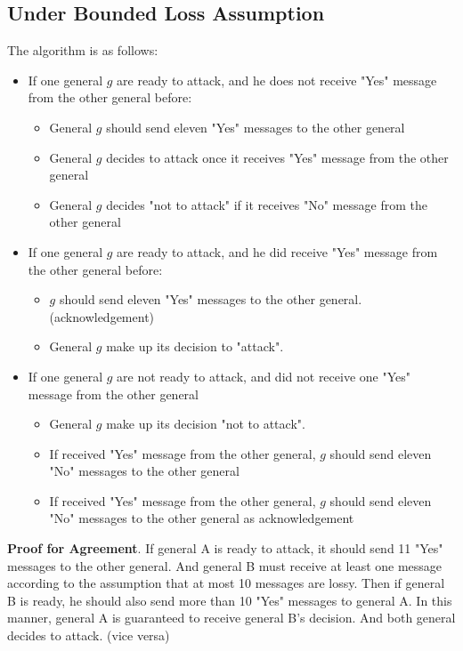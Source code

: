 \documentclass[11pt,a4paper]{article}
\begin{document}
\subsection{Under Bounded Loss Assumption}
The algorithm is as follows: 
\begin{itemize} 
    \item{If one general $g$ are ready to attack, and he does not receive "Yes"
        message from the other general before: }
        \begin{itemize}
            \item{General $g$ should send eleven "Yes" messages to the other general}
            \item{General $g$ decides to attack once it receives "Yes" message
                    from the other general}
            \item{General $g$ decides "not to attack" if it receives "No" message
                    from the other general}
        \end{itemize}
    \item{If one general $g$ are ready to attack, and he did receive "Yes"
        message from the other general before: }
        \begin{itemize}
            \item{$g$ should send eleven "Yes" messages to the other general.
                    (acknowledgement)}
            \item{General $g$ make up its decision to "attack".}
        \end{itemize}
    \item{If one general $g$ are not ready to attack, and did not receive one "Yes"
            message from the other general}
        \begin{itemize}
            \item{General $g$ make up its decision "not to attack".}
            \item{If received "Yes" message from the other general, $g$ should
                    send eleven "No" messages to the other general}
            \item{If received "Yes" message from the other general, $g$ should
                    send eleven "No" messages to the other general as
                    acknowledgement}
        \end{itemize}
\end{itemize}

\textbf{Proof for Agreement}. 
If general A is ready to attack, it should send 11 "Yes" messages to
the other general. And general B must receive at least one message
according to the assumption that at most 10 messages are lossy. Then if
general B is ready, he should also send more than 10 "Yes" messages to general A.
In this manner, general A is guaranteed to receive general B's decision. And
both general decides to attack. (vice versa)
\end{document}
